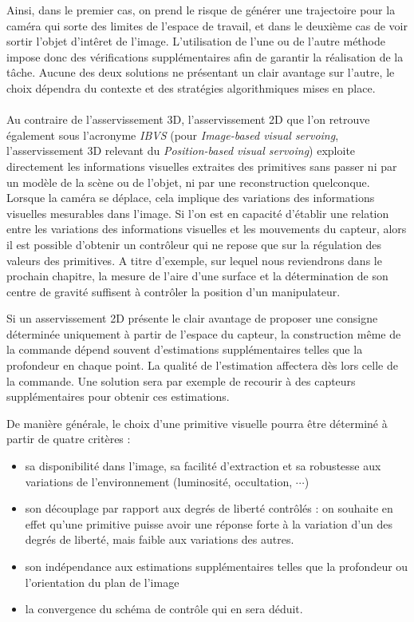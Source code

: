 Ainsi, dans le premier cas, on prend le risque de g\'en\'erer une trajectoire 
pour la cam\'era qui sorte des limites de l'espace de travail, et dans le 
deuxi\`eme cas de voir sortir l'objet d'int\^eret de l'image. L'utilisation de 
l'une ou de l'autre m\'ethode impose donc des v\'erifications suppl\'ementaires 
afin de garantir la r\'ealisation de la t\^ache. Aucune des deux solutions ne 
pr\'esentant un clair avantage sur l'autre, le choix d\'ependra du contexte et 
des strat\'egies algorithmiques mises en place.\\

 \\

Au contraire de l'asservissement 3D, l'asservissement 2D que l'on retrouve 
\'egalement sous l'acronyme {\it IBVS} (pour {\it Image-based visual servoing}, 
l'asser\-vissement 3D relevant du {\it Position-based visual servoing}) 
exploite directement les informations visuelles extraites des primitives sans 
passer ni par un mod\`ele de la sc\`ene ou de l'objet, ni par une reconstruction 
quelconque. Lorsque la cam\'era se d\'eplace, cela implique des variations des 
informations visuelles mesurables dans l'image. Si l'on est en capacit\'e 
d'\'etablir une relation entre les variations des informations visuelles et 
les mouvements du capteur, alors il est possible d'obtenir un contr\^oleur qui 
ne repose que sur la r\'egulation des valeurs des primitives. A titre 
d'exemple, sur lequel nous reviendrons dans le prochain chapitre, la mesure de 
l'aire d'une surface et la d\'etermination de son centre de gravit\'e suffisent 
\`a contr\^oler la position d'un manipulateur.

Si un asservissement 2D pr\'esente le clair avantage de proposer une consigne 
d\'etermin\'ee uniquement \`a partir de l'espace du capteur, la construction 
m\^eme de la commande d\'epend souvent d'estimations suppl\'ementaires telles 
que la profondeur en chaque point. La qualit\'e de l'estimation affectera d\`es 
lors celle de la commande. Une solution sera par exemple de recourir \`a 
des capteurs suppl\'ementaires pour obtenir ces estimations. 

De mani\`ere g\'en\'erale, le choix d'une primitive visuelle pourra \^etre 
d\'etermin\'e \`a partir de quatre crit\`eres :
\begin{itemize}
 \item sa disponibilit\'e dans l'image, sa facilit\'e d'extraction et sa 
robustesse aux variations de l'environnement (luminosit\'e, occultation, 
$\cdots$)
  \item son d\'ecouplage par rapport aux degr\'es de libert\'e contr\^ol\'es : 
on souhaite en effet qu'une primitive puisse avoir une r\'eponse forte \`a la 
variation d'un des degr\'es de libert\'e, mais faible aux variations des autres.
  \item son ind\'ependance aux estimations suppl\'ementaires telles que la 
profondeur ou l'orientation du plan de l'image
  \item la convergence du sch\'ema de contr\^ole qui en sera d\'eduit.
\end{itemize}

